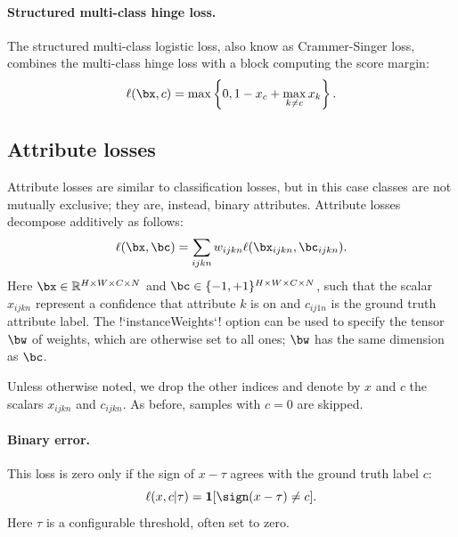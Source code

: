 \paragraph{Structured multi-class hinge loss.} The structured multi-class logistic loss, also know as Crammer-Singer loss, combines the multi-class hinge loss with a block computing the score margin:
\begin{equation}\label{e:loss-structuredmulticlasshinge}
	\ell(\bx, c) = \max\left\{0, 1 - x_c + \max_{k \not= c} x_k\right\}.
\end{equation}

\subsection{Attribute losses}\label{s:loss-attributes}

Attribute losses are similar to classification losses, but in this case classes are not mutually exclusive; they are, instead, binary attributes. Attribute losses decompose additively as follows:
\begin{equation}\label{e:addlossattribute}
\ell(\bx,\bc) = \sum_{ijkn} w_{ijkn} \ell(\bx_{ijkn}, \bc_{ijkn}).
\end{equation}
Here $\bx\in \mathbb{R}^{H \times W \times C \times N}$ and $\bc \in \{-1,+1\}^{H \times W \times C \times N}$, such that the scalar $x_{ijkn}$ represent a confidence that attribute $k$ is on and $c_{ij1n}$ is the ground truth attribute label. The !`instanceWeights`! option can be used to specify the tensor $\bw$ of weights, which are otherwise set to all ones; $\bw$ has the same dimension as $\bc$.

 Unless otherwise noted, we drop the other indices and denote by $x$ and $c$  the scalars $x_{ijkn}$ and  $c_{ijkn}$. As before, samples with $c=0$ are skipped.

\paragraph{Binary error.} This loss is zero only if the sign of $x - \tau$ agrees with the ground truth label $c$:
\begin{equation}\label{e:loss-binary}
 \ell(x,c|\tau) = \mathbf{1}[\sign(x-\tau) \not= c].
\end{equation}
Here $\tau$ is a configurable threshold, often set to zero.

